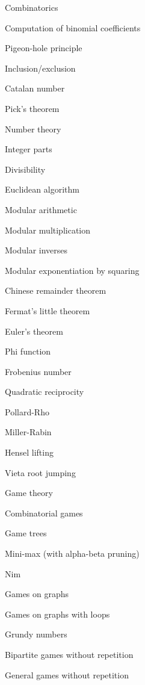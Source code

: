 \begin{myitemize}
\item Combinatorics
\begin{myitemize}
	\item Computation of binomial coefficients
	\item Pigeon-hole principle
	\item Inclusion/exclusion
	\item Catalan number
	\item Pick's theorem
\end{myitemize}
\item Number theory
\begin{myitemize}
	\item Integer parts
	\item Divisibility
	\item Euclidean algorithm
	\item Modular arithmetic
	\begin{myitemize}
		\item Modular multiplication
		\item Modular inverses
		\item Modular exponentiation by squaring
	\end{myitemize}
	\item Chinese remainder theorem
	\item Fermat's little theorem
	\item Euler's theorem
	\item Phi function
	\item Frobenius number
	\item Quadratic reciprocity
	\item Pollard-Rho
	\item Miller-Rabin
	\item Hensel lifting
	\item Vieta root jumping
\end{myitemize}
\item Game theory
\begin{myitemize}
	\item Combinatorial games
	\item Game trees
	\item Mini-max (with alpha-beta pruning)
	\item Nim
	\item Games on graphs
	\item Games on graphs with loops
	\item Grundy numbers
	\item Bipartite games without repetition
	\item General games without repetition

\end{myitemize}
\end{myitemize}

